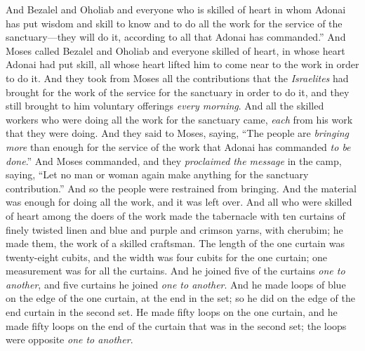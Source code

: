 \begin{biblechapter} %
\verse And Bezalel and Oholiab and everyone who is skilled of heart in whom Adonai has put wisdom and skill to know and to do all the work for the service of the sanctuary—they will do it, according to all that Adonai has commanded.”
 And Moses called Bezalel and Oholiab and everyone skilled of heart, in whose heart Adonai had put skill, all whose heart lifted him to come near to the work in order to do it.
\verse And they took from Moses all the contributions that the \textit{Israelites} had brought for the work of the service for the sanctuary in order to do it, and they still brought to him voluntary offerings \textit{every morning}.
\verse And all the skilled workers who were doing all the work for the sanctuary came, \textit{each} from his work that they were doing.
\verse And they said to Moses, saying, “The people are \textit{bringing more} than enough for the service of the work that Adonai has commanded \textit{to be done}.”
\verse And Moses commanded, and they \textit{proclaimed the message} in the camp, saying, “Let no man or woman again make anything for the sanctuary contribution.” And so the people were restrained from bringing.
\verse And the material was enough for doing all the work, and it was left over.
\verse And all who were skilled of heart among the doers of the work made the tabernacle with ten curtains of finely twisted linen and blue and purple and crimson yarns, with cherubim; he made them, the work of a skilled craftsman.
\verse The length of the one curtain was twenty-eight cubits, and the width was four cubits for the one curtain; one measurement was for all the curtains.
\verse And he joined five of the curtains \textit{one to another}, and five curtains he joined \textit{one to another}.
\verse And he made loops of blue on the edge of the one curtain, at the end in the set; so he did on the edge of the end curtain in the second set.
\verse He made fifty loops on the one curtain, and he made fifty loops on the end of the curtain that was in the second set; the loops were opposite \textit{one to another}.

\end{biblechapter}
